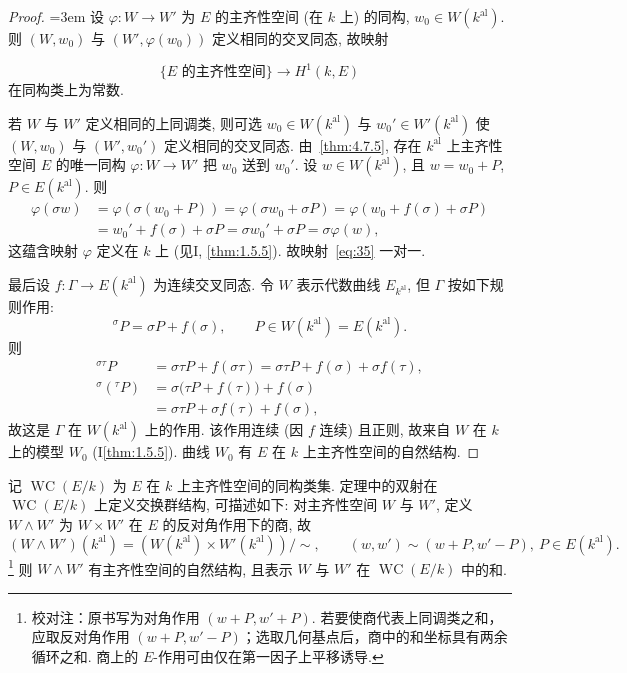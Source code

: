 \begin{proof}
{\emergencystretch=3em 设 $\varphi\colon W\to W'$ 为 $E$ 的主齐性空间 (在 $k$ 上) 的同构, $w_0\in W(k^{\mathrm{al}})$. 则 $(W, w_0)$ 与 $(W', \varphi(w_0))$ 定义相同的交叉同态, 故映射\par}
\[
\{E \text{ 的主齐性空间}\}\to H^1(k, E)
\]
在同构类上为常数.

若 $W$ 与 $W'$ 定义相同的上同调类, 则可选 $w_0\in W(k^{\mathrm{al}})$ 与 $w_0'\in W'(k^{\mathrm{al}})$ 使 $(W, w_0)$ 与 $(W', w_0')$ 定义相同的交叉同态. 由~\ref{thm:4.7.5}, 存在 $k^{\mathrm{al}}$ 上主齐性空间 $E$ 的唯一同构 $\varphi\colon W\to W'$ 把 $w_0$ 送到 $w_0'$. 设 $w\in W(k^{\mathrm{al}})$, 且 $w = w_0 + P$, $P\in E(k^{\mathrm{al}})$. 则
\begin{align*}
\varphi(\sigma w) &= \varphi(\sigma(w_0 + P)) = \varphi(\sigma w_0 + \sigma P) = \varphi(w_0 + f(\sigma) + \sigma P)\\
&= w_0' + f(\sigma) + \sigma P = \sigma w_0' + \sigma P = \sigma\varphi(w),
\end{align*}
这蕴含映射 $\varphi$ 定义在 $k$ 上 (见I, \ref{thm:1.5.5}). 故映射~\eqref{eq:35} 一对一.

最后设 $f\colon\Gamma\to E(k^{\mathrm{al}})$ 为连续交叉同态. 令 $W$ 表示代数曲线 $E_{k^{\mathrm{al}}}$, 但 $\Gamma$ 按如下规则作用:
\[
{}^{\sigma}P = \sigma P + f(\sigma), \qquad P\in W(k^{\mathrm{al}}) = E(k^{\mathrm{al}}).
\]
则
\[
\begin{aligned}
{}^{\sigma\tau}P
&= \sigma\tau P + f(\sigma\tau)
= \sigma\tau P + f(\sigma) + \sigma f(\tau),\\
{}^{\sigma}({}^{\tau}P)
&= \sigma\bigl(\tau P + f(\tau)\bigr) + f(\sigma)\\
&= \sigma\tau P + \sigma f(\tau) + f(\sigma),
\end{aligned}
\]
故这是 $\Gamma$ 在 $W(k^{\mathrm{al}})$ 上的作用. 该作用连续 (因 $f$ 连续) 且正则, 故来自 $W$ 在 $k$ 上的模型 $W_0$ (I\ref{thm:1.5.5}). 曲线 $W_0$ 有 $E$ 在 $k$ 上主齐性空间的自然结构.
\end{proof}

\begin{aside} \label{thm:4.7.9} 
记 $\operatorname{WC}(E/k)$ 为 $E$ 在 $k$ 上主齐性空间的同构类集. 定理中的双射在 $\operatorname{WC}(E/k)$ 上定义交换群结构, 可描述如下: 对主齐性空间 $W$ 与 $W'$, 定义 $W\wedge W'$ 为 $W\times W'$ 在 $E$ 的反对角作用下的商, 故
\[
(W\wedge W')(k^{\mathrm{al}}) = (W(k^{\mathrm{al}})\times W'(k^{\mathrm{al}}))/{\sim}, \qquad
(w, w')\sim(w + P, w' - P), \ P\in E(k^{\mathrm{al}}).
\]
\footnote{校对注：原书写为对角作用 $(w+P,w'+P)$. 若要使商代表上同调类之和，应取反对角作用 $(w+P,w'-P)$；选取几何基点后，商中的和坐标具有两余循环之和. 商上的 $E$-作用可由仅在第一因子上平移诱导.} 则 $W\wedge W'$ 有主齐性空间的自然结构, 且表示 $W$ 与 $W'$ 在 $\operatorname{WC}(E/k)$ 中的和.
\end{aside}

